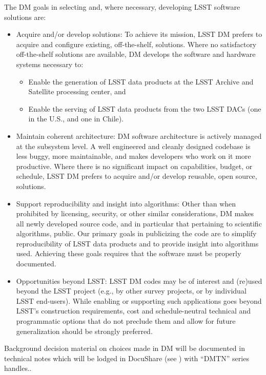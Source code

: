 The DM goals in selecting and, where necessary, developing LSST software solutions are:

\begin{itemize}
	\item Acquire and/or develop solutions: To achieve its mission, LSST DM prefers to acquire and configure existing, off-the-shelf, solutions. Where no satisfactory off-the-shelf solutions are available, DM develops the software and hardware systems necessary to:
\begin{itemize}
	\item Enable the generation of LSST data products at the LSST Archive and Satellite processing center, and
	\item Enable the serving of LSST data products from the two LSST DACs (one in the U.S., and one in Chile).
\end{itemize}
	\item Maintain coherent architecture: DM software architecture is actively managed at the subsystem level. A well engineered and cleanly designed codebase is less buggy, more maintainable, and makes developers who work on it more productive. Where there is no significant impact on capabilities, budget, or schedule, LSST DM prefers to acquire and/or develop reusable, open source, solutions.
	\item Support reproducibility and insight into algorithms: Other than when prohibited by licensing, security, or other similar considerations, DM makes all newly developed source code, and in particular that pertaining to scientific algorithms,  public. Our primary goals in publicizing the code are to simplify reproducibility of LSST data products and to provide insight into algorithms used. Achieving these goals requires that the software must be properly documented.
	\item Opportunities beyond LSST: LSST DM codes may be of interest and (re)used beyond the LSST project (e.g., by other survey projects, or by individual LSST end-users). While enabling or supporting such applications goes beyond LSST’s construction requirements, cost and schedule-neutral technical and programmatic options that do not preclude them and allow for future generalization should be strongly preferred.


\end{itemize}

Background decision material on choices made in DM will be documented in technical notes which will be lodged in DocuShare (see ) with ``DMTN'' series handles..

